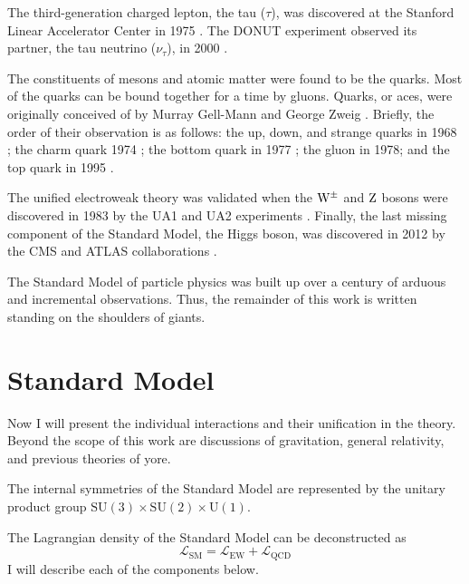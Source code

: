 The third-generation charged lepton, the tau ($\tau$), was discovered at the Stanford Linear Accelerator Center in 1975 \cite{Perl1975}.
The DONUT experiment observed its partner, the tau neutrino ($\nu_\tau$), in 2000 \cite{Donut2001}.

The constituents of mesons and atomic matter were found to be the quarks.
Most of the quarks can be bound together for a time by gluons. 
Quarks, or aces, were originally conceived of by Murray Gell-Mann \cite{GellMann:1964nj} and George Zweig \cite{Zweig:570209}.
Briefly, the order of their observation is as follows: 
the up, down, and strange quarks in 1968 \cite{PhysRevLett.23.930} \cite{PhysRevLett.23.935};
the charm quark 1974 \cite{Ting1974} \cite{Richter1974};
the bottom quark in 1977 \cite{Lederman1977};
the gluon in 1978; \cite{Stella2011}
and the top quark in 1995 \cite{CDFTop1995} \cite{D0Top1995}.

The unified electroweak theory was validated when the $\mathrm{W}^\pm$ and $\mathrm{Z}$ bosons 
were discovered in 1983 by the UA1 and UA2 experiments 
\cite{Arnison:1983mk} \cite{Arnison:1983rp} \cite{Bagnaia:1983zx} \cite{Banner:1983jy}. 
Finally, the last missing component of the Standard Model, the Higgs boson, was discovered in 2012 by the CMS and ATLAS collaborations \cite{Chatrchyan:2012xdj} \cite{Aad:2012tfa}.

The Standard Model of particle physics was built up over a century of arduous and incremental observations. Thus, the remainder of this work is written standing on the shoulders of giants.

\section{Standard Model}
Now I will present the individual interactions and their unification in the theory.
Beyond the scope of this work are discussions of gravitation, general relativity, and
previous theories of yore.

The internal symmetries of the Standard Model are represented by the unitary product group 
$\mathrm{SU}(3) \times \mathrm{SU}(2) \times \mathrm{U}(1)$.

The Lagrangian density of the Standard Model can be deconstructed as
\begin{equation}
\mathcal{L}_\mathrm{SM} = \mathcal{L}_\mathrm{EW} + \mathcal{L}_\mathrm{QCD}
\end{equation}
I will describe each of the components below.

